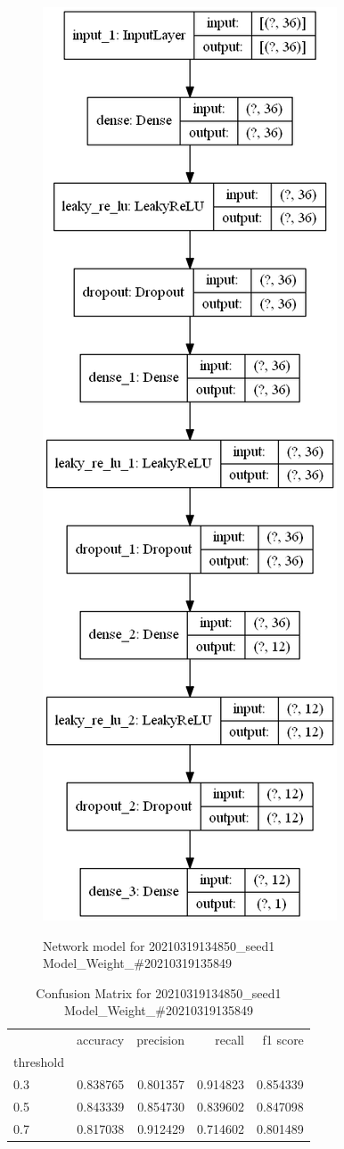         \begin{figure}
        \caption{Network model for 20210319134850\_seed1 Model\_Weight\_\#20210319135849}
        \centering
            \includegraphics[width=0.5\linewidth]{20210319134850_seed1/ModelWeight20210319135849/model_struct.png}
        \label{fig:20210319134850seed1/ModelWeight20210319135849/modelstruct.png}
        \end{figure}
        \begin{table}
\centering
\caption{Confusion Matrix for 20210319134850\_seed1 Model\_Weight\_\#20210319135849}
\label{tab:conf_matr20210319134850seed1ModelWeight20210319135849}
\begin{tabular}{lrrrr}
\toprule
{} &  accuracy &  precision &    recall &  f1 score \\
threshold &           &            &           &           \\
\midrule
0.3       &  0.838765 &   0.801357 &  0.914823 &  0.854339 \\
0.5       &  0.843339 &   0.854730 &  0.839602 &  0.847098 \\
0.7       &  0.817038 &   0.912429 &  0.714602 &  0.801489 \\
\bottomrule
\end{tabular}
\end{table}

